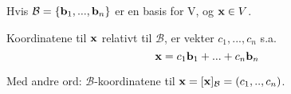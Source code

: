 Hvis $\mathcal{B} = \{ \mathbf{b}_1, ..., \mathbf{b}_n \}$ er en basis for V,
og $\mathbf{x} \in V$.

Koordinatene til $\mathbf{x}$ relativt til $\mathcal{B}$,
er vekter $c_1, ..., c_n$ s.a.
$$\mathbf{x} = c_1\mathbf{b}_1 + ... + c_n\mathbf{b}_n$$

Med andre ord: $\mathcal{B}$-koordinatene til $\mathbf{x}
  = [\mathbf{x}]_\mathcal{B}
  = (c_1, .., c_n)$.
